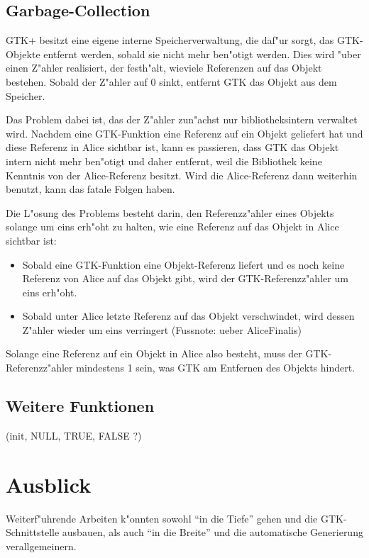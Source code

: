 \documentclass{article}
\begin{document}
\subsection{Garbage-Collection}

GTK+ besitzt eine eigene interne Speicherverwaltung, die daf"ur sorgt,
das GTK-Objekte entfernt werden, sobald sie nicht mehr ben"otigt werden.
Dies wird "uber einen Z"ahler realisiert, der festh"alt, wieviele
Referenzen auf das Objekt bestehen. Sobald der Z"ahler auf 0 sinkt,
entfernt GTK das Objekt aus dem Speicher.

Das Problem dabei ist, das der Z"ahler zun"achst nur bibliotheksintern
verwaltet wird. Nachdem eine GTK-Funktion eine Referenz
auf ein Objekt geliefert hat und diese Referenz in Alice sichtbar ist,
kann es passieren, dass GTK das Objekt intern nicht mehr ben"otigt und
daher entfernt, weil die Bibliothek keine Kenntnis von der Alice-Referenz
besitzt. Wird die Alice-Referenz dann weiterhin benutzt, kann das fatale
Folgen haben.

Die L"osung des Problems besteht darin, den Referenzz"ahler eines Objekts
solange um eins erh"oht zu halten, wie eine Referenz auf das Objekt in
Alice sichtbar ist:

\begin{itemize}
\item Sobald eine GTK-Funktion eine Objekt-Referenz liefert und es noch keine
      Referenz von Alice auf das Objekt gibt, wird der GTK-Referenzz"ahler
      um eins erh"oht.
\item Sobald unter Alice letzte Referenz auf das Objekt verschwindet, wird
      dessen Z"ahler wieder um eins verringert (Fussnote: ueber AliceFinalis)
\end{itemize}

Solange eine Referenz auf ein Objekt in Alice also besteht, muss der
GTK-Referenzz"ahler mindestens 1 sein, was GTK am Entfernen des Objekts
hindert.

\subsection{Weitere Funktionen}

(init, NULL, TRUE, FALSE ?)

\section{Ausblick}

Weiterf"uhrende Arbeiten k"onnten sowohl ``in die Tiefe'' gehen und die
GTK-Schnittstelle ausbauen, als auch ``in die Breite'' und die automatische
Generierung verallgemeinern.
\end{document}
